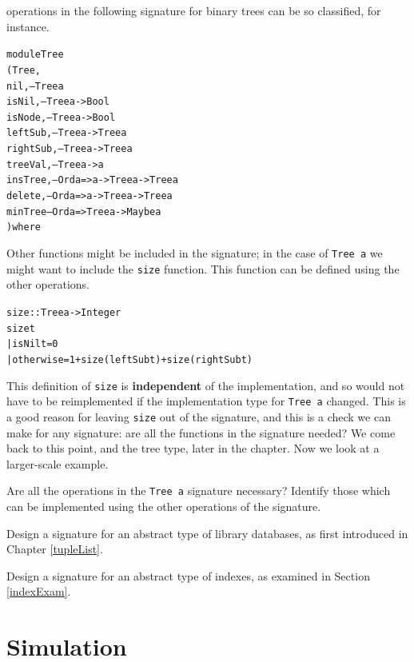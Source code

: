 operations in the following signature for binary trees can be so classified,
for instance.
\begin{alltt}
module Tree
  (Tree,
   nil,           -- Tree a
   isNil,         -- Tree a -> Bool  
   isNode,        -- Tree a -> Bool
   leftSub,       -- Tree a -> Tree a 
   rightSub,      -- Tree a -> Tree a 
   treeVal,       -- Tree a -> a
   insTree,       -- Ord a => a -> Tree a -> Tree a 
   delete,        -- Ord a => a -> Tree a -> Tree a
   minTree        -- Ord a => Tree a -> Maybe a
  ) where
\end{alltt}
Other functions might be included in the signature; in the case of \texttt{Tree
a} we might want to include the \texttt{size}
function. This function can be defined
using the other operations.
\begin{alltt}
size :: Tree a -> Integer
size t 
  | isNil t     = 0
  | otherwise   = 1 + size (leftSub t) + size (rightSub t)
\end{alltt}
This definition of \texttt{size} is \textbf{independent} of the implementation,
and so would not have to be reimplemented if the implementation type for
\texttt{Tree a} changed. This is a good reason for leaving \texttt{size} out
of the signature, and this is a check we can make for any signature: are all
the functions in the signature needed? We come back to this point, and the
tree type, later in the chapter. Now we look at a larger-scale example.

\begin{exercises}

\item
Are all the operations in the \texttt{Tree a} signature necessary? Identify those
which can be implemented using the other operations of the signature.

\item
Design a signature for an abstract type of library databases, as first
introduced in Chapter \ref{tupleList}.

\item
Design a signature for an abstract type of indexes, as examined in Section
\ref{indexExam}. 

\end{exercises}
\section{Simulation}

